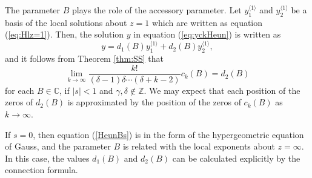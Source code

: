 \documentclass[12pt]{amsart}
\newcommand{\Zint}{\mathbb {Z}}
\newcommand{\Cplx}{\mathbb {C}}     %
\numberwithin{equation}{section}
\theoremstyle{definition}
\theoremstyle{remark}
\begin{document}
The parameter $B$ plays the role of the accessory parameter.
Let $y^{\langle 1 \rangle} _1$ and $y^{\langle 1 \rangle} _2 $ be a basis of the local solutions about $z=1$ which are written as equation (\ref{eq:Hlz=1}).
Then, the solution $y$ in equation (\ref{eq:yckHeun}) is written as
\begin{equation}
 y = d_{1}(B)  y^{\langle 1 \rangle} _1  + d_2 (B)  y^{\langle 1 \rangle} _2 ,
\label{eq:d1Bd2B}
\end{equation}
and it follows from Theorem \ref{thm:SS} that 
\begin{equation}
\lim _{k \to \infty} \frac{ k! }{ (\delta -1) \delta  \cdots (\delta  +k -2)} c_k (B) = d_2 (B)
\label{eq:limkckd2B}
\end{equation}
for each $B \in \Cplx $, if $|s|<1$ and $\gamma , \delta \not \in \Zint $.
We may expect that each position of the zeros of $d_2 (B) $ is approximated by the position of the zeros of $c_k (B) $ as $k \to \infty $.

If $s=0$, then equation (\ref{HeunBs}) is in the form of the hypergeometric equation of Gauss, and the parameter $B$ is related with the local exponents about $z=\infty $.
In this case, the values $d_1 (B)$ and $d_2 (B)$ can be calculated explicitly by the connection formula.
\end{document}
